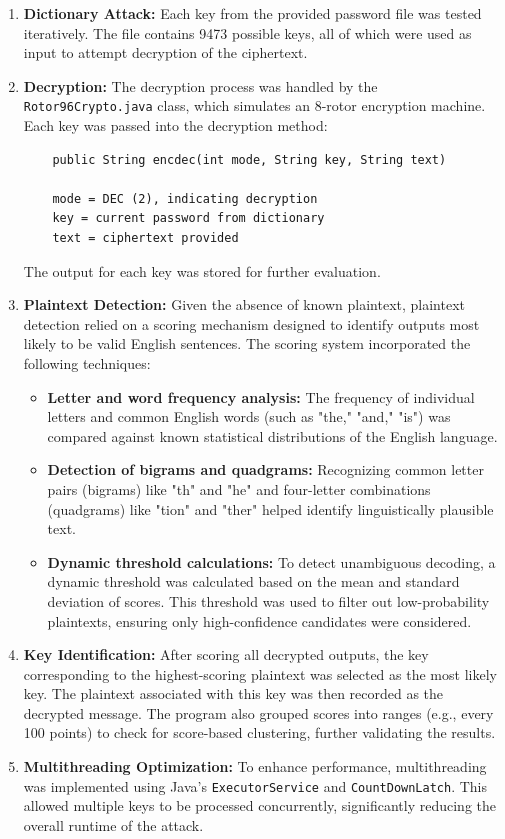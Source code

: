 \documentclass{article}
\begin{document}
\begin{enumerate}
    \item \textbf{Dictionary Attack:} Each key from the provided password file was tested iteratively. The file contains 9473 possible keys, all of which were used as input to attempt decryption of the ciphertext.
    
    \item \textbf{Decryption:} The decryption process was handled by the \texttt{Rotor96Crypto.java} class, which simulates an 8-rotor encryption machine. Each key was passed into the decryption method:
    \begin{verbatim}
    public String encdec(int mode, String key, String text)
    
    mode = DEC (2), indicating decryption
    key = current password from dictionary
    text = ciphertext provided
    \end{verbatim}
    The output for each key was stored for further evaluation.

    \item \textbf{Plaintext Detection:} Given the absence of known plaintext, plaintext detection relied on a scoring mechanism designed to identify outputs most likely to be valid English sentences. The scoring system incorporated the following techniques:
    \begin{itemize}
        \item \textbf{Letter and word frequency analysis:} The frequency of individual letters and common English words (such as "the," "and," "is") was compared against known statistical distributions of the English language.
        \item \textbf{Detection of bigrams and quadgrams:} Recognizing common letter pairs (bigrams) like "th" and "he" and four-letter combinations (quadgrams) like "tion" and "ther" helped identify linguistically plausible text.
        \item \textbf{Dynamic threshold calculations:} To detect unambiguous decoding, a dynamic threshold was calculated based on the mean and standard deviation of scores. This threshold was used to filter out low-probability plaintexts, ensuring only high-confidence candidates were considered.
    \end{itemize}

    \item \textbf{Key Identification:} After scoring all decrypted outputs, the key corresponding to the highest-scoring plaintext was selected as the most likely key. The plaintext associated with this key was then recorded as the decrypted message. The program also grouped scores into ranges (e.g., every 100 points) to check for score-based clustering, further validating the results.

    \item \textbf{Multithreading Optimization:} To enhance performance, multithreading was implemented using Java's \texttt{ExecutorService} and \texttt{CountDownLatch}. This allowed multiple keys to be processed concurrently, significantly reducing the overall runtime of the attack.
\end{enumerate}
\end{document}
